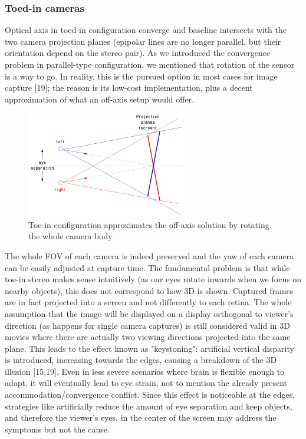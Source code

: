 \subsubsection{Toed-in cameras}
Optical axis in toed-in configuration converge and baseline intersects with the two camera projection planes (epipolar lines are no longer parallel, but their orientation depend on the stereo pair). As we introduced the convergence problem in parallel-type configuration, we mentioned that rotation of the sensor is a way to go. In reality, this is the pursued option in most cases for image capture [19]; the reason is its low-cost implementation, plus a decent approximation of what an off-axis setup would offer.
\begin{figure}
\centering
\includegraphics[width=7cm]{schemas/toein}
\caption{Toe-in configuration approximates the off-axis solution by rotating the whole camera body}
\label{fig:toedin_cameras}
\end{figure}
The whole FOV of each camera is indeed preserved and the yaw of each camera can be easily adjusted at capture time. The fundamental problem is that while toe-in stereo makes sense intuitively (as our eyes rotate inwards when we focus on nearby objects), this does not correspond to how 3D is shown. Captured frames are in fact projected into a screen and not differently to each retina. The whole assumption that the image will be displayed on a display orthogonal to viewer's direction (as happens for single camera captures) is still considered valid in 3D movies where there are actually two viewing directions projected into the same plane. This leads to the effect known as "keystoning": artificial vertical disparity is introduced, increasing towards the edges, causing a breakdown of the 3D illusion [15,19]. Even in less severe scenarios where brain is flexible enough to adapt, it will eventually lead to eye strain, not to mention the already present accommodation/convergence conflict. Since this effect is noticeable at the edges, strategies like artificially reduce the amount of eye separation and keep objects, and therefore the viewer's eyes, in the center of the screen may address the symptoms but not the cause.

